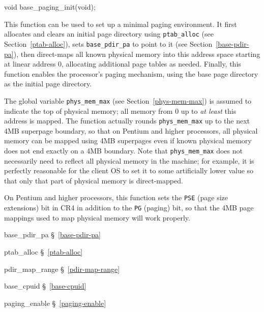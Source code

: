 \label{base-paging-init}
\begin{apisyn}

	\funcproto void base_paging_init(void);
\end{apisyn}
\begin{apidesc}
	This function can be used to set up a minimal paging environment.
	It first allocates and clears an initial page directory
	using {\tt ptab_alloc} (see Section~\ref{ptab-alloc}),
	sets {\tt base_pdir_pa} to point to it (see Section~\ref{base-pdir-pa}),
	then direct-maps all known physical memory into this address space
	starting at linear address 0,
	allocating additional page tables as needed.
	Finally, this function enables the processor's paging mechanism,
	using the base page directory as the initial page directory.

	The global variable {\tt phys_mem_max} (see Section~\ref{phys-mem-max})
	is assumed to indicate the top of physical memory;
	all memory from 0 up to \emph{at least} this address is mapped.
	The function actually rounds {\tt phys_mem_max} up
	to the next 4MB superpage boundary,
	so that on Pentium and higher processors,
	all physical memory can be mapped using 4MB superpages
	even if known physical memory does not end exactly on a 4MB boundary.
	Note that {\tt phys_mem_max} does not necessarily need to reflect
	all physical memory in the machine;
	for example, it is perfectly reasonable for the client OS
	to set it to some artificially lower value
	so that only that part of physical memory is direct-mapped.

	On Pentium and higher processors,
	this function sets the {\tt PSE} (page size extensions) bit in CR4
	in addition to the {\tt PG} (paging) bit,
	so that the 4MB page mappings used to map physical memory
	will work properly.
\end{apidesc}
\begin{apidep}
	\item[base_pdir_pa]		\S~\ref{base-pdir-pa}
	\item[ptab_alloc]		\S~\ref{ptab-alloc}
	\item[pdir_map_range]		\S~\ref{pdir-map-range}
	\item[base_cpuid]		\S~\ref{base-cpuid}
	\item[paging_enable]		\S~\ref{paging-enable}
\end{apidep}

